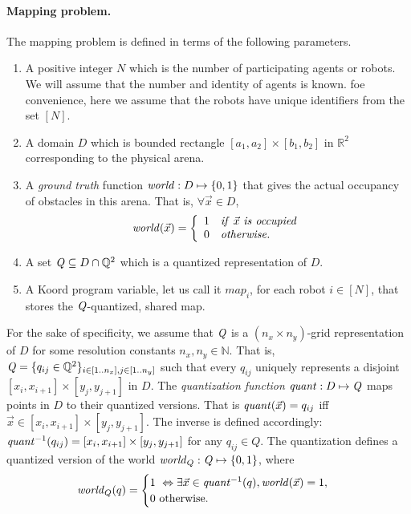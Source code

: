 \paragraph{Mapping problem.}
The mapping problem is defined in terms of the following parameters.
\begin{enumerate}
	\item A positive integer $N$ which is the number of participating agents or robots. We will assume that the number and identity of agents is known. foe convenience, here we assume that the robots have unique identifiers from the set $[N]$.
	\item A domain $D$ which is bounded rectangle $[a_1,a_2]\times [b_1,b_2]$ in $\mathbb{R}^2$ corresponding to the physical arena.
	\item A \emph{ground truth} function $\mathit{world} : D\mapsto \left\{0,1\right\}$ that gives the actual  occupancy of obstacles in this arena. That is, $\forall \Vec{x} \in D$, 
\begin{align}
\mathit{world}(\Vec{x}) = 
		\left\{
		\begin{array}{ll}
			1 & \mathit{if}\ \Vec{x} \ \mathit{is \ occupied}\\
			0 & \mathit{otherwise}.
		\end{array}
		\right.
\end{align}
	\item A set $\mathit{Q} \subseteq D \cap \mathbb{Q}^2$ which is a quantized representation of $D$.
	\item A Koord program variable, let us call it $\mathit{map}_i$, for each robot $i \in [N]$, that stores the $\mathit{Q}$-quantized, shared map.
\end{enumerate}
For the sake of specificity, we assume that $\mathit{Q}$ is a $(n_x\times n_y)$-grid representation of $D$ for some resolution constants $n_x,n_y \in \mathbb{N}$. That is, $\mathit{Q} = \{q_{ij} \in \mathbb{Q}^2\}_{i\in [1..n_x], j\in [1..n_y]}$ such that every $q_{ij}$ uniquely represents a disjoint $[x_i, x_{i+1}] \times [y_j, y_{j+1}]$ in $D$.
%
    The \emph{quantization function}  $\mathit{quant}:D \mapsto \mathit{Q}$ maps points in $D$ to their quantized versions. That is $\mathit{quant}(\Vec{x}) = q_{ij}$ iff $\Vec{x} \in [x_i, x_{i+1}] \times [y_j, y_{j+1}]$.
The inverse is defined accordingly: $\mathit{quant}^{-1}(q_{ij}) =  [x_i, x_{i+1}] \times [y_j, y_{j+1}]$ for any $q_{ij} \in Q$. 
%
The quantization defines a quantized version of the world $\mathit{world}_Q : \mathit{Q} \mapsto \left\{0,1\right\}$, where
$$\mathit{world}_Q(q) = \begin{cases}
        1\ \Leftrightarrow \exists \Vec{x}\in \mathit{quant}^{-1}(q), \mathit{world}(\Vec{x}) = 1, \\
        0\ \mbox{otherwise}.
\end{cases}
$$
%

